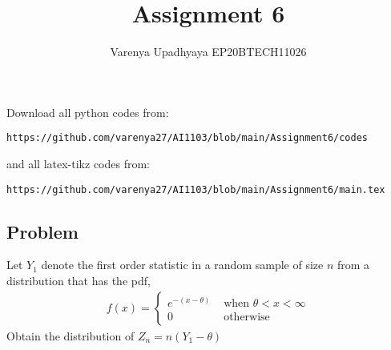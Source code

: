 \documentclass[journal,12pt,twocolumn]{IEEEtran}
\title{Assignment 6}
\author{Varenya Upadhyaya EP20BTECH11026}
\date{}
\theoremstyle{remark}
\numberwithin{equation}{subsection}
\begin{document}
\maketitle
Download all python codes from:
\begin{lstlisting}
https://github.com/varenya27/AI1103/blob/main/Assignment6/codes
\end{lstlisting}
and all latex-tikz codes from:
\begin{lstlisting}
https://github.com/varenya27/AI1103/blob/main/Assignment6/main.tex
\end{lstlisting}
\maketitle   
\begin{center}
\section{\textbf{Problem}}
\end{center}
Let $Y_1$ denote the first order statistic in a random sample of size $n$ from a distribution that has the pdf, 
\begin{align}
    f(x) = \nonumber
    \begin{cases}
    e^{-(x-\theta)}&\text{ when } \theta<x<\infty\\
    0 &\text{  otherwise} 
    \end{cases}
\end{align}
Obtain the distribution of $Z_n = n(Y_1 - \theta)$\\
\maketitle
\end{document}
